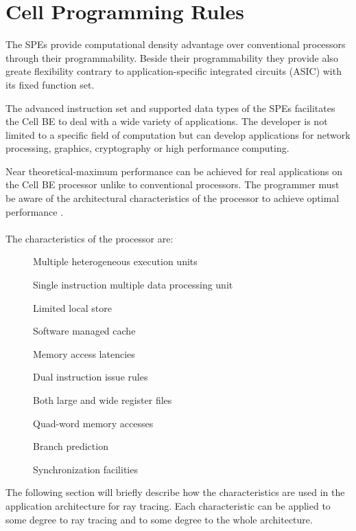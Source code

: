 \documentclass[DIV10, abstracton, openright, footsepline, headsepline, twoside, 9pt,
bigheadings]{scrreprt}
\begin{document}
\section{Cell Programming Rules}
The SPEs provide computational density advantage over conventional processors
through their programmability. Beside their programmability they provide
also greate flexibility contrary to application-specific integrated circuits
(ASIC) with its fixed function set.

The advanced instruction set and supported data types of the SPEs facilitates
the Cell BE to deal with a wide variety of applications. The developer is not
limited to a specific field of computation but can develop applications
for network processing, graphics, cryptography or high performance computing.

Near theoretical-maximum performance can be achieved for real applications on the
Cell BE processor unlike to conventional processors. The programmer must be
aware of the architectural characteristics of the processor to achieve
optimal performance \cite{Brokenshire06}.\\\\
The characteristics of the processor are:
\begin{description}
\item[\color{Bigblue}{$\triangleright$}] Multiple heterogeneous execution units
\item[\color{Bigblue}{$\triangleright$}] Single instruction multiple data processing unit
\item[\color{Bigblue}{$\triangleright$}] Limited local store
\item[\color{Bigblue}{$\triangleright$}] Software managed cache
\item[\color{Bigblue}{$\triangleright$}] Memory access latencies
\item[\color{Bigblue}{$\triangleright$}] Dual instruction issue rules
\item[\color{Bigblue}{$\triangleright$}] Both large and wide register files
\item[\color{Bigblue}{$\triangleright$}] Quad-word memory accesses
\item[\color{Bigblue}{$\triangleright$}] Branch prediction
\item[\color{Bigblue}{$\triangleright$}] Synchronization facilities
\end{description}
The following section will briefly describe how the characteristics are used
in the application architecture for ray tracing. Each characteristic can be
applied to some degree to ray tracing and to some degree to the whole
architecture.
\end{document}
